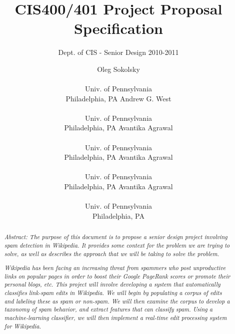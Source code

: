 \documentclass[letterpaper]{sig-alternate}
\begin{document}
 

\title{CIS400/401 Project Proposal Specification}
\subtitle{Dept. of CIS - Senior Design 2010-2011}
\author{
\alignauthor Oleg Sokolsky \\  \\ Univ. of Pennsylvania \\ Philadelphia, PA
\alignauthor Andrew G. West \\  \\ Univ. of Pennsylvania \\ Philadelphia, PA
\alignauthor Avantika Agrawal \\  \\ Univ. of Pennsylvania \\ Philadelphia, PA
\alignauthor Avantika Agrawal \\  \\ Univ. of Pennsylvania \\ Philadelphia, PA
\alignauthor Avantika Agrawal \\  \\ Univ. of Pennsylvania \\ Philadelphia, PA}
\date{}
\maketitle

\begin{abstract}
\textit{Abstract: The purpose of this document is to propose a senior design project involving spam detection in Wikipedia. It provides some context for the problem we are trying to solve, as well as describes the approach that we will be taking to solve the problem.}

\textit{Wikipedia has been facing an increasing threat from spammers who post unproductive links on popular pages in order to boost their Google PageRank scores or promote their personal blogs, etc. This project will involve developing a system that automatically classifies link-spam edits in Wikipedia. We will begin by populating a corpus of edits and labeling these as spam or non-spam. We will then examine the corpus to develop a taxonomy of spam behavior, and extract features that can classify spam. Using a machine-learning classifier, we will then implement a real-time edit processing system for Wikipedia.}
\end{abstract}
\end{document}
